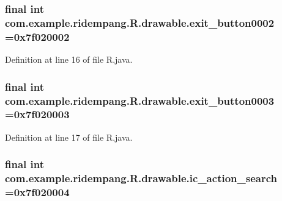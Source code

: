 \hypertarget{classcom_1_1example_1_1ridempang_1_1_r_1_1drawable_a3b61f9dadd44a618935f894471398052}{
\subsubsection[{exit\-\_\-button0002}]{\setlength{\rightskip}{0pt plus 5cm}final int com.\-example.\-ridempang.\-R.\-drawable.\-exit\-\_\-button0002 =0x7f020002\hspace{0.3cm}{\ttfamily [static]}}}\label{classcom_1_1example_1_1ridempang_1_1_r_1_1drawable_a3b61f9dadd44a618935f894471398052}


Definition at line 16 of file R.\-java.

\hypertarget{classcom_1_1example_1_1ridempang_1_1_r_1_1drawable_ae3201e7aa951d02ed05a15d7e141fa47}{
\subsubsection[{exit\-\_\-button0003}]{\setlength{\rightskip}{0pt plus 5cm}final int com.\-example.\-ridempang.\-R.\-drawable.\-exit\-\_\-button0003 =0x7f020003\hspace{0.3cm}{\ttfamily [static]}}}\label{classcom_1_1example_1_1ridempang_1_1_r_1_1drawable_ae3201e7aa951d02ed05a15d7e141fa47}


Definition at line 17 of file R.\-java.

\hypertarget{classcom_1_1example_1_1ridempang_1_1_r_1_1drawable_ac0928c652f560f42b9aaff087e71c528}{
\subsubsection[{ic\-\_\-action\-\_\-search}]{\setlength{\rightskip}{0pt plus 5cm}final int com.\-example.\-ridempang.\-R.\-drawable.\-ic\-\_\-action\-\_\-search =0x7f020004\hspace{0.3cm}{\ttfamily [static]}}}\label{classcom_1_1example_1_1ridempang_1_1_r_1_1drawable_ac0928c652f560f42b9aaff087e71c528}


